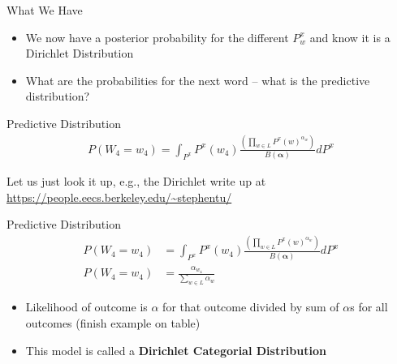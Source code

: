 \documentclass[11pt]{beamer}
\begin{document}
	\begin{frame}{What We Have}
		\begin{itemize}
			\item We now have a posterior probability for the different $P_{w}^{x}$ and know it is a Dirichlet Distribution
			\item What are the probabilities for the next word -- what is the predictive distribution?
		\end{itemize}
	\end{frame}
	
	\begin{frame}{Predictive Distribution}
		\begin{align*}
			P(W_4 = w_4) = \int_{P^x} P^x(w_4) \frac{\left(\prod_{w \in L} P^{x}(w)^{\alpha_{w}}\right)}{B(\boldsymbol{\alpha})} d P^x
		\end{align*}
		
		\vspace{10pt} Let us just look it up, e.g., the Dirichlet write up at \url{https://people.eecs.berkeley.edu/~stephentu/} 
	\end{frame}
	
	\begin{frame}{Predictive Distribution}
		\begin{align*}
			P(W_4 = w_4) & = \int_{P^x} P^x(w_4) \frac{\left(\prod_{w \in L} P^{x}(w)^{\alpha_{w}}\right)}{B(\boldsymbol{\alpha})} d P^x \\
			P(W_4 = w_4) & = \frac{\alpha_{w_4}}{\sum_{w \in L} \alpha_{w}}
		\end{align*}
			
		\vspace{10pt}
		\begin{itemize}
			\item Likelihood of outcome is $\alpha$ for that outcome divided by sum of $\alpha$s for all outcomes (finish example on table)
			\item This model is called a \textbf{Dirichlet Categorial Distribution}
		\end{itemize}
		 
	\end{frame}
	
\end{document}
